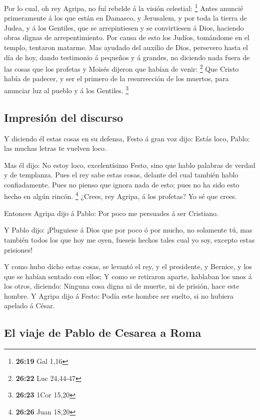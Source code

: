  Por lo cual, oh rey Agripa, no fuí rebelde á la visión
celestial: \footnote{\textbf{26:19} Gal 1,16}  Antes
anuncié primeramente á los que están en Damasco, y Jerusalem, y por toda
la tierra de Judea, y á los Gentiles, que se arrepintiesen y se
convirtiesen á Dios, haciendo obras dignas de arrepentimiento.
 Por causa de esto los Judíos, tomándome en el templo,
tentaron matarme.  Mas ayudado del auxilio de Dios,
persevero hasta el día de hoy, dando testimonio á pequeños y á grandes,
no diciendo nada fuera de las cosas que los profetas y Moisés dijeron
que habían de venir: \footnote{\textbf{26:22} Luc 24,44-47}
 Que Cristo había de padecer, y ser el primero de la
resurrección de los muertos, para anunciar luz al pueblo y á los
Gentiles. \footnote{\textbf{26:23} 1Cor 15,20}

\hypertarget{impresiuxf3n-del-discurso}{%
\subsection{Impresión del discurso}\label{impresiuxf3n-del-discurso}}

 Y diciendo él estas cosas en su defensa, Festo á gran voz
dijo: Estás loco, Pablo: las muchas letras te vuelven loco.

 Mas él dijo: No estoy loco, excelentísimo Festo, sino que
hablo palabras de verdad y de templanza.  Pues el rey sabe
estas cosas, delante del cual también hablo confiadamente. Pues no
pienso que ignora nada de esto; pues no ha sido esto hecho en algún
rincón. \footnote{\textbf{26:26} Juan 18,20}  ¿Crees, rey
Agripa, á los profetas? Yo sé que crees.

 Entonces Agripa dijo á Pablo: Por poco me persuades á ser
Cristiano.

 Y Pablo dijo: ¡Pluguiese á Dios que por poco ó por mucho,
no solamente tú, mas también todos los que hoy me oyen, fueseis hechos
tales cual yo soy, excepto estas prisiones!

 Y como hubo dicho estas cosas, se levantó el rey, y el
presidente, y Bernice, y los que se habían sentado con ellos;
 Y como se retiraron aparte, hablaban los unos á los otros,
diciendo: Ninguna cosa digna ni de muerte, ni de prisión, hace este
hombre.  Y Agripa dijo á Festo: Podía este hombre ser
suelto, si no hubiera apelado á César.

\hypertarget{el-viaje-de-pablo-de-cesarea-a-roma}{%
\subsection{El viaje de Pablo de Cesarea a
Roma}\label{el-viaje-de-pablo-de-cesarea-a-roma}}

